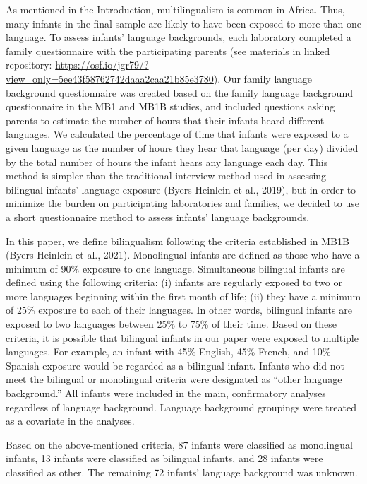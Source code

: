 \documentclass[
  ,man,floatsintext]{apa6}
\begin{document}
As mentioned in the Introduction, multilingualism is common in Africa. Thus, many infants in the final sample are likely to have been exposed to more than one language. To assess infants' language backgrounds, each laboratory completed a family questionnaire with the participating parents (see materials in linked repository: \url{https://osf.io/jgr79/?view_only=5ee43f58762742daaa2caa21b85e3780}). Our family language background questionnaire was created based on the family language background questionnaire in the MB1 and MB1B studies, and included questions asking parents to estimate the number of hours that their infants heard different languages. We calculated the percentage of time that infants were exposed to a given language as the number of hours they hear that language (per day) divided by the total number of hours the infant hears any language each day. This method is simpler than the traditional interview method used in assessing bilingual infants' language exposure (Byers-Heinlein et al., 2019), but in order to minimize the burden on participating laboratories and families, we decided to use a short questionnaire method to assess infants' language backgrounds.

In this paper, we define bilingualism following the criteria established in MB1B (Byers-Heinlein et al., 2021). Monolingual infants are defined as those who have a minimum of 90\% exposure to one language. Simultaneous bilingual infants are defined using the following criteria: (i) infants are regularly exposed to two or more languages beginning within the first month of life; (ii) they have a minimum of 25\% exposure to each of their languages. In other words, bilingual infants are exposed to two languages between 25\% to 75\% of their time. Based on these criteria, it is possible that bilingual infants in our paper were exposed to multiple languages. For example, an infant with 45\% English, 45\% French, and 10\% Spanish exposure would be regarded as a bilingual infant. Infants who did not meet the bilingual or monolingual criteria were designated as ``other language background.'' All infants were included in the main, confirmatory analyses regardless of language background. Language background groupings were treated as a covariate in the analyses.

Based on the above-mentioned criteria, 87 infants were classified as monolingual infants, 13 infants were classified as bilingual infants, and 28 infants were classified as other. The remaining 72 infants' language background was unknown.
\end{document}
